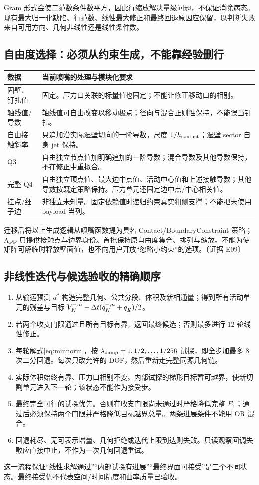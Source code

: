 \documentclass[UTF8,a4paper,11pt,fontset=fandol]{ctexart}
\newcommand{\ev}[1]{{\small\color{muted}〔证据 #1〕}}
\begin{document}
Gram 形式会使二范数条件数平方，因此行缩放解决量级问题，不保证消除病态。现有最大归一化缺陷、行范数、线性最大修正和最终回退原因应保留，以判断失败来自可用方向、几何非线性还是线性条件数。

\subsection{自由度选择：必须从约束生成，不能靠经验删行}
\begin{longtable}{@{}P{.25\textwidth}P{.69\textwidth}@{}}
\toprule 数据 & 当前喷嘴的处理与模块化要求\\\midrule\endhead
固壁、钉扎值 & 固定。压力口关联的标量值也固定；不能让修正移动口的相别。\\
轴线值/导数 & 轴线值可自由改变以移动极点；径向与混合正则性保持，不能误当钉扎。\\
自由接触斜率 & 只追加沿实际湿壁切向的一阶导数，尺度 $1/h_{\rm contact}$；湿壁 sector 自身 jet 保持。\\
Q3 & 自由独立节点值加明确追加的一阶导数；混合导数及其他导数保持，不在修正中重拟合。\\
完整 Q4 & 自由独立顶点值、最大边中点值、活动中心值和上述接触导数；其他导数按既定策略保持。压力单元还固定边中点/中心相关值。\\
挂点/细子边 & 非独立未知量。固定依赖值时递归约束真实粗侧支撑；不能把未使用 payload 当列。\\
\bottomrule
\end{longtable}
迁移后将以上生成逻辑从喷嘴函数提为具名 Contact/BoundaryConstraint 策略；App 只提供接触点与边界身份。首批保持原自由度集合、排列与缩放。不能为使矩阵可解临时释放壁面值，也不向用户开放“忽略小约束”的选项。\ev{E09}

\subsection{非线性迭代与候选验收的精确顺序}
\begin{enumerate}
\item 从输运预测 $d^*$ 构造完整几何、公共分段、体积及新相通量；得到所有活动单元的残差与目标 $V_K^{-,n}-\Delta t(q_K^{-,n}+q_K^-)/2$。
\item 若两个收支门限通过且所有目标有界，返回最终候选；否则最多进行 12 轮线性修正。
\item 每轮解式\eqref{eq:minnorm}，按 $\lambda_{\rm damp}=1,1/2,\ldots,1/256$ 试探，即全步加最多 8 次二分回退。每次只改允许的 DOF，然后重新走完整同源几何链。
\item 实际体积始终有界、压力口相别不变。内部试探的梯形目标暂可越界，使新切割单元进入下一轮；该状态不能作为接受步。
\item 最终完全可行的试探优先。否则在收支门限尚未通过时严格降低完整 $E_1$；通过后必须保持两个门限并严格降低目标越界总量。两条进展条件不能用 OR 混合。
\item 回退耗尽、无可表示增量、几何拒绝或迭代上限到达则失败。只读观察回调失败应直接中止，不作为一次几何回退重试。
\end{enumerate}
这一流程保证“线性求解通过”“内部试探有进展”“最终界面可接受”是三个不同状态。最终接受仍不代表空间/时间精度和曲率质量已验收。
\end{document}
